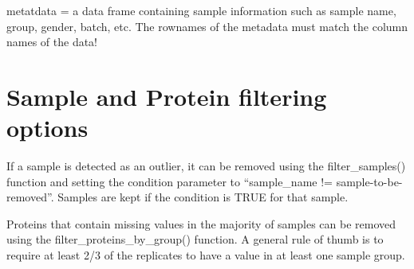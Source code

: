 \documentclass[
]{article}
\newenvironment{Shaded}{\begin{snugshade}}{\end{snugshade}}
\newcommand{\AttributeTok}[1]{\textcolor[rgb]{0.77,0.63,0.00}{#1}}
\newcommand{\CommentTok}[1]{\textcolor[rgb]{0.56,0.35,0.01}{\textit{#1}}}
\newcommand{\ConstantTok}[1]{\textcolor[rgb]{0.00,0.00,0.00}{#1}}
\newcommand{\DecValTok}[1]{\textcolor[rgb]{0.00,0.00,0.81}{#1}}
\newcommand{\FunctionTok}[1]{\textcolor[rgb]{0.00,0.00,0.00}{#1}}
\newcommand{\NormalTok}[1]{#1}
\newcommand{\OtherTok}[1]{\textcolor[rgb]{0.56,0.35,0.01}{#1}}
\newcommand{\SpecialCharTok}[1]{\textcolor[rgb]{0.00,0.00,0.00}{#1}}
\newcommand{\StringTok}[1]{\textcolor[rgb]{0.31,0.60,0.02}{#1}}
\begin{document}
metatdata = a data frame containing sample information such as sample
name, group, gender, batch, etc. The rownames of the metadata must match
the column names of the data!

\begin{Shaded}
\end{Shaded}

\hypertarget{sample-and-protein-filtering-options}{%
\section{Sample and Protein filtering
options}\label{sample-and-protein-filtering-options}}

If a sample is detected as an outlier, it can be removed using the
filter\_samples() function and setting the condition parameter to
``sample\_name != sample-to-be-removed''. Samples are kept if the
condition is TRUE for that sample.

Proteins that contain missing values in the majority of samples can be
removed using the filter\_proteins\_by\_group() function. A general rule
of thumb is to require at least 2/3 of the replicates to have a value in
at least one sample group.
\end{document}
